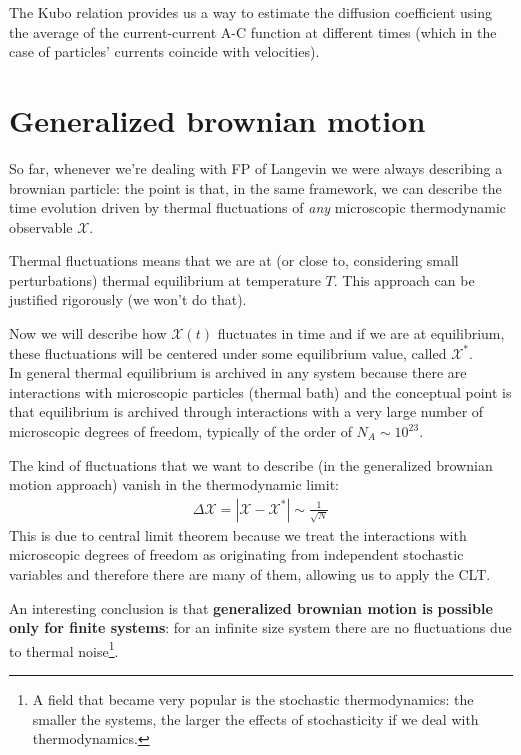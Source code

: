 \documentclass[\main/main.tex]{subfiles}
\begin{document}
The Kubo relation provides us a way to estimate the diffusion coefficient using the average of the current-current A-C function at different times (which in the case of particles' currents coincide with velocities).

\section{Generalized brownian motion}
So far, whenever we're dealing with FP of Langevin we were always describing a brownian particle: the point is that, in the same framework, we can describe the time evolution driven by thermal fluctuations of \textit{any} microscopic thermodynamic observable $\mathcal{X}$.

Thermal fluctuations means that we are at (or close to, considering small perturbations) thermal equilibrium at temperature $T$. This approach can be justified rigorously (we won't do that).

Now we will describe how $\mathcal{X}(t)$ fluctuates in time and if we are at equilibrium, these fluctuations will be centered under some equilibrium value, called $\mathcal{X}^*$. \\

In general thermal equilibrium is archived in any system because there are interactions with microscopic particles (thermal bath) and the conceptual point is that equilibrium is archived through interactions with a very large number of microscopic degrees of freedom, typically of the order of $N_A\sim 10^{23}$.

The kind of fluctuations that we want to describe (in the generalized brownian motion approach) vanish in the thermodynamic limit:
\begin{align}
    \Delta\mathcal{X}=|\mathcal{X}-\mathcal{X}^*| \sim \frac{1}{\sqrt{N}}
\end{align}
This is due to central limit theorem because we treat the interactions with microscopic degrees of freedom as originating from independent stochastic variables and therefore there are many of them, allowing us to apply the CLT.

An interesting conclusion is that \textbf{generalized brownian motion is} \textbf{possible only for finite systems}: for an infinite size system there are no fluctuations due to thermal noise\footnote{A field that became very popular is the stochastic thermodynamics: the smaller the systems, the larger the effects of stochasticity if we deal with thermodynamics.}.
\end{document}
